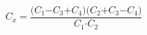 \begin{equation}
\label{eq13}
C_x\mathrm{=}\frac{\mathrm{(}C_{\mathrm{1}}\mathrm{-}C_{\mathrm{3}}\mathrm{+}C_{\mathrm{4}}\mathrm{)(}C_{\mathrm{2}}\mathrm{+}C_{\mathrm{3}}\mathrm{-}C_{\mathrm{4}}\mathrm{)}}{C_{\mathrm{1}}\mathrm{\cdot }C_{\mathrm{2}}}
\end{equation}